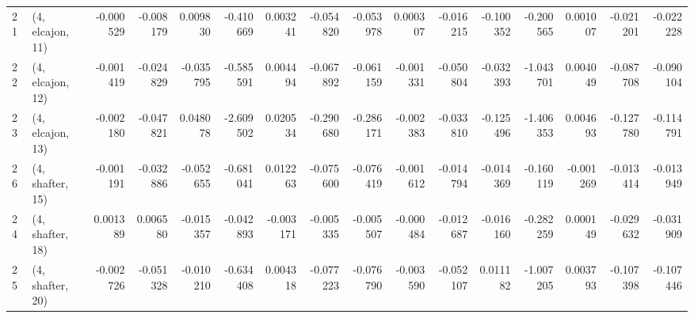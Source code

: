 \begin{tabular}{llrrrrrrrrrrrrrr}
21 &  (4, elcajon, 11) &  -0.000529 & -0.008179 &  0.009830 &  -0.410669 &  0.003241 &  -0.054820 & -0.053978 &  0.000307 & -0.016215 & -0.100352 &  -0.200565 &  0.001007 & -0.021201 & -0.022228 \\
22 &  (4, elcajon, 12) &  -0.001419 & -0.024829 & -0.035795 &  -0.585591 &  0.004494 &  -0.067892 & -0.061159 & -0.001331 & -0.050804 & -0.032393 &  -1.043701 &  0.004049 & -0.087708 & -0.090104 \\
23 &  (4, elcajon, 13) &  -0.002180 & -0.047821 &  0.048078 &  -2.609502 &  0.020534 &  -0.290680 & -0.286171 & -0.002383 & -0.033810 & -0.125496 &  -1.406353 &  0.004693 & -0.127780 & -0.114791 \\
26 &  (4, shafter, 15) &  -0.001191 & -0.032886 & -0.052655 &  -0.681041 &  0.012263 &  -0.075600 & -0.076419 & -0.001612 & -0.014794 & -0.014369 &  -0.160119 & -0.001269 & -0.013414 & -0.013949 \\
24 &  (4, shafter, 18) &   0.001389 &  0.006580 & -0.015357 &  -0.042893 & -0.003171 &  -0.005335 & -0.005507 & -0.000484 & -0.012687 & -0.016160 &  -0.282259 &  0.000149 & -0.029632 & -0.031909 \\
25 &  (4, shafter, 20) &  -0.002726 & -0.051328 & -0.010210 &  -0.634408 &  0.004318 &  -0.077223 & -0.076790 & -0.003590 & -0.052107 &  0.011182 &  -1.007205 &  0.003793 & -0.107398 & -0.107446 \\
\bottomrule
\end{tabular}
